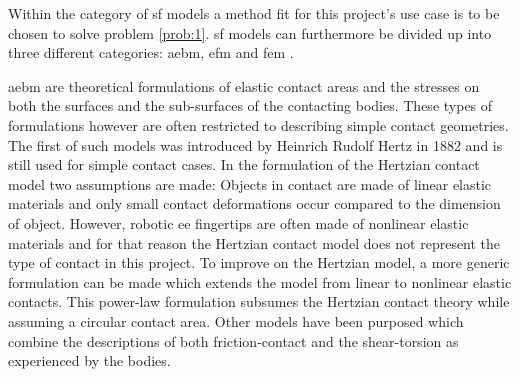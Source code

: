 Within the category of \gls{sf} models a method fit for this project's use case is to be chosen to solve problem \ref{prob:1}. \gls{sf} models can furthermore be divided up into three different categories: \gls{aebm}, \gls{efm} and \gls{fem} \cite{a-modified-elastic-foundation-contact-model-for-application-in-3d-models-of-the-prosthetic-knee}. \medskip

\gls{aebm} are theoretical formulations of elastic contact areas and the stresses on both the surfaces and the sub-surfaces of the contacting bodies. These types of formulations however are often restricted to describing simple contact geometries. The first of such models was introduced by Heinrich Rudolf Hertz in 1882\cite*{on-the-contact-of-rigid-elastic-solids-and-on-hardness} and is still used for simple contact cases. In the formulation of the Hertzian contact model two assumptions are made: Objects in contact are made of linear elastic materials and only small contact deformations occur compared to the dimension of object. However, robotic \gls{ee} fingertips are often made of nonlinear elastic materials and for that reason the Hertzian contact model does not represent the type of contact in this project\cite[Chapter 37]{handbook-of-robotics}. To improve on the Hertzian model, a more generic formulation can be made which extends the model from linear to nonlinear elastic contacts\cite*{modeling-of-contact-mechanics-and-friction-limit-surfaces-for-soft-fingers-in-robotics-with-experimental-results}\cite*{the-haptic-and-perceptional-characteristics-of-an-anthropomorphic-curved-soft-finger-structure}. This power-law formulation subsumes the Hertzian contact theory while assuming a circular contact area. Other models have been purposed which combine the descriptions of both friction-contact and the shear-torsion as experienced by the bodies\cite{the-sliding-of-robot-fingers-under-combined-torsion-and-shear-loading}. \medskip

